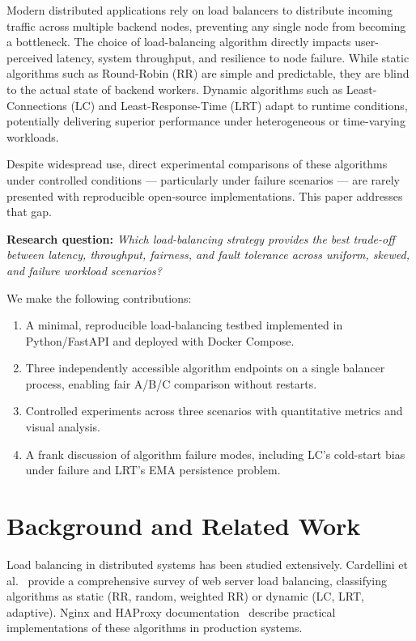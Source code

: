 \documentclass[conference]{IEEEtran}
\begin{document}
Modern distributed applications rely on load balancers to distribute incoming traffic across multiple backend nodes, preventing any single node from becoming a bottleneck. The choice of load-balancing algorithm directly impacts user-perceived latency, system throughput, and resilience to node failure. While static algorithms such as Round-Robin (RR) are simple and predictable, they are blind to the actual state of backend workers. Dynamic algorithms such as Least-Connections (LC) and Least-Response-Time (LRT) adapt to runtime conditions, potentially delivering superior performance under heterogeneous or time-varying workloads.

Despite widespread use, direct experimental comparisons of these algorithms under controlled conditions --- particularly under failure scenarios --- are rarely presented with reproducible open-source implementations. This paper addresses that gap.

\textbf{Research question:} \textit{Which load-balancing strategy provides the best trade-off between latency, throughput, fairness, and fault tolerance across uniform, skewed, and failure workload scenarios?}

We make the following contributions:
\begin{enumerate}
  \item A minimal, reproducible load-balancing testbed implemented in Python/FastAPI and deployed with Docker Compose.
  \item Three independently accessible algorithm endpoints on a single balancer process, enabling fair A/B/C comparison without restarts.
  \item Controlled experiments across three scenarios with quantitative metrics and visual analysis.
  \item A frank discussion of algorithm failure modes, including LC's cold-start bias under failure and LRT's EMA persistence problem.
\end{enumerate}

\section{Background and Related Work}

Load balancing in distributed systems has been studied extensively. Cardellini et al.~\cite{cardellini1999} provide a comprehensive survey of web server load balancing, classifying algorithms as static (RR, random, weighted RR) or dynamic (LC, LRT, adaptive). Nginx and HAProxy documentation~\cite{nginx2024,haproxy2024} describe practical implementations of these algorithms in production systems.
\end{document}
